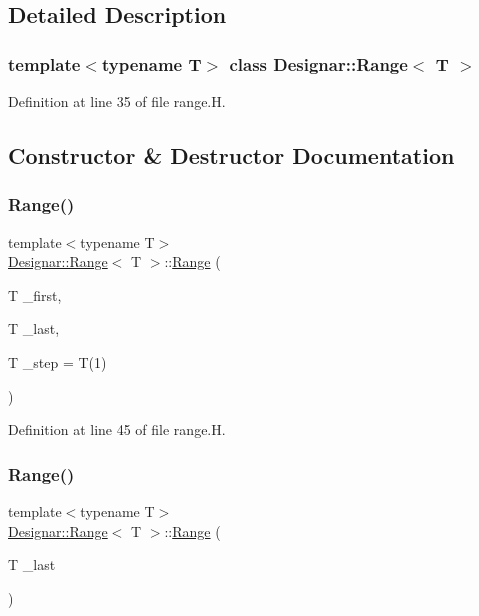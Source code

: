 \subsection{Detailed Description}
\subsubsection*{template$<$typename T$>$\newline
class Designar\+::\+Range$<$ T $>$}



Definition at line 35 of file range.\+H.



\subsection{Constructor \& Destructor Documentation}
\mbox{\label{class_designar_1_1_range_a45c16ed23ea9052133bd8bd1ef3542b1}} 
\subsubsection{\texorpdfstring{Range()}{Range()}\hspace{0.1cm}{\footnotesize\ttfamily [1/2]}}
{\footnotesize\ttfamily template$<$typename T$>$ \\
\hyperlink{class_designar_1_1_range}{Designar\+::\+Range}$<$ T $>$\+::\hyperlink{class_designar_1_1_range}{Range} (\begin{DoxyParamCaption}\item[{T}]{\+\_\+first,  }\item[{T}]{\+\_\+last,  }\item[{T}]{\+\_\+step = {\ttfamily T(1)} }\end{DoxyParamCaption})\hspace{0.3cm}{\ttfamily [inline]}}



Definition at line 45 of file range.\+H.

\mbox{\label{class_designar_1_1_range_a2a6163d6685fc38f387c36a33ce91578}} 
\subsubsection{\texorpdfstring{Range()}{Range()}\hspace{0.1cm}{\footnotesize\ttfamily [2/2]}}
{\footnotesize\ttfamily template$<$typename T$>$ \\
\hyperlink{class_designar_1_1_range}{Designar\+::\+Range}$<$ T $>$\+::\hyperlink{class_designar_1_1_range}{Range} (\begin{DoxyParamCaption}\item[{T}]{\+\_\+last }\end{DoxyParamCaption})\hspace{0.3cm}{\ttfamily [inline]}}



